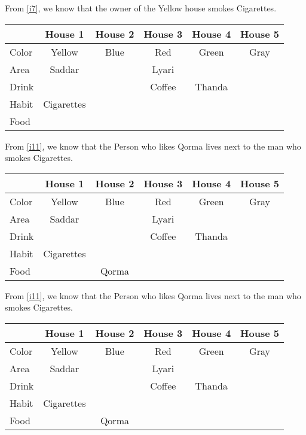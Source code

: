 \documentclass[a4paper]{exam}
\newcommand\cb{\color{blue}}
\begin{document}
\begin{questions}
\begin{solution}
        From \ref{i7}, we know that the owner of the Yellow house smokes Cigarettes. \\
    \begin{tabular}{l||*5{c|}}
      & \textbf{House 1} & \textbf{\cb House 2} & \textbf{House 3} & \textbf{House 4} & \textbf{House 5} \\
      \hline\hline
      Color & Yellow & Blue & Red& Green & Gray\\\hline
      Area & Saddar & & Lyari & & \\\hline
      Drink & & &Coffee & Thanda & \\\hline
      Habit & Cigarettes& & & & \\\hline
      Food & & & & & \\\hline
      \end{tabular}

    From \ref{i11}, we know that the Person who likes Qorma lives next to the man who smokes Cigarettes. \\
    \begin{tabular}{l||*5{c|}}
      & \textbf{House 1} & \textbf{\cb House 2} & \textbf{House 3} & \textbf{House 4} & \textbf{House 5} \\
      \hline\hline
      Color & Yellow & Blue & Red& Green & Gray\\\hline
      Area & Saddar & & Lyari & & \\\hline
      Drink & & &Coffee & Thanda & \\\hline
      Habit & Cigarettes& & & & \\\hline
      Food & & Qorma & & & \\\hline
      \end{tabular}

      From \ref{i11}, we know that the Person who likes Qorma lives next to the man who smokes Cigarettes. \\
    \begin{tabular}{l||*5{c|}}
      & \textbf{House 1} & \textbf{\cb House 2} & \textbf{House 3} & \textbf{House 4} & \textbf{House 5} \\
      \hline\hline
      Color & Yellow & Blue & Red& Green & Gray\\\hline
      Area & Saddar & & Lyari & & \\\hline
      Drink & & &Coffee & Thanda & \\\hline
      Habit & Cigarettes& & & & \\\hline
      Food & & Qorma & & & \\\hline
      \end{tabular}


\end{solution}
\end{questions}
\end{document}
